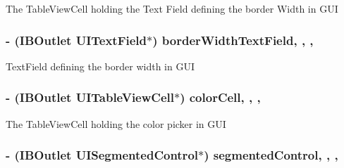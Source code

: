 The Table\-View\-Cell holding the Text Field defining the border Width in G\-U\-I \hypertarget{interface_a_p_d_f_new_annotation_v_c_ab9d6df4725587308fbe5505fe8af68a2}{
\subsubsection[{border\-Width\-Text\-Field}]{\setlength{\rightskip}{0pt plus 5cm}-\/ (I\-B\-Outlet U\-I\-Text\-Field$\ast$) border\-Width\-Text\-Field\hspace{0.3cm}{\ttfamily [read]}, {\ttfamily [write]}, {\ttfamily [nonatomic]}, {\ttfamily [retain]}}}\label{interface_a_p_d_f_new_annotation_v_c_ab9d6df4725587308fbe5505fe8af68a2}
Text\-Field defining the border width in G\-U\-I \hypertarget{interface_a_p_d_f_new_annotation_v_c_a8691cbdfc67a5e5cc3ba78374d52ecd7}{
\subsubsection[{color\-Cell}]{\setlength{\rightskip}{0pt plus 5cm}-\/ (I\-B\-Outlet U\-I\-Table\-View\-Cell$\ast$) color\-Cell\hspace{0.3cm}{\ttfamily [read]}, {\ttfamily [write]}, {\ttfamily [nonatomic]}, {\ttfamily [retain]}}}\label{interface_a_p_d_f_new_annotation_v_c_a8691cbdfc67a5e5cc3ba78374d52ecd7}
The Table\-View\-Cell holding the color picker in G\-U\-I \hypertarget{interface_a_p_d_f_new_annotation_v_c_a70602e9005fc6e7982fa2ba5b4a58849}{
\subsubsection[{segmented\-Control}]{\setlength{\rightskip}{0pt plus 5cm}-\/ (I\-B\-Outlet U\-I\-Segmented\-Control$\ast$) segmented\-Control\hspace{0.3cm}{\ttfamily [read]}, {\ttfamily [write]}, {\ttfamily [nonatomic]}, {\ttfamily [retain]}}}\label{interface_a_p_d_f_new_annotation_v_c_a70602e9005fc6e7982fa2ba5b4a58849}
